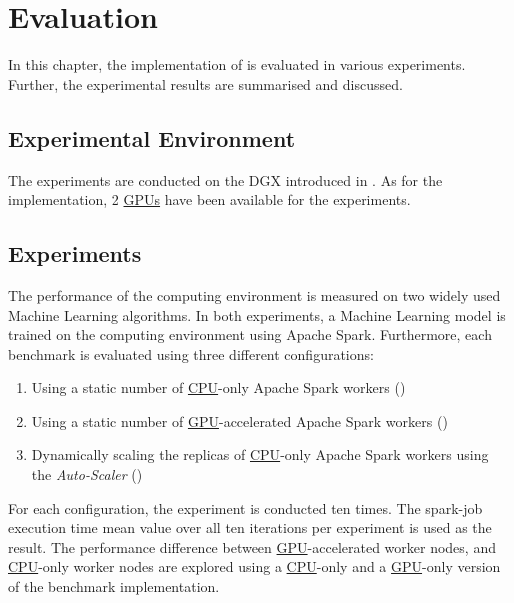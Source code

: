 \chapter{Evaluation}
\label{chap:07_evaluation}

In this chapter, the implementation of  is evaluated in various experiments. Further, the experimental results are summarised and discussed.

\section{Experimental Environment}
%
The experiments are conducted on the DGX introduced in .
As for the implementation, 2 \hyperlink{abbr:gpu}{GPUs} have been available for the experiments.


\section{Experiments}
The performance of the computing environment is measured on two widely used Machine Learning algorithms.
In both experiments, a Machine Learning model is trained on the computing environment using Apache Spark. Furthermore, each benchmark is evaluated using three different configurations:
\begin{enumerate}
\item Using a static number of \hyperlink{abbr:cpu}{CPU}-only Apache Spark workers ()
\item Using a static number of \hyperlink{abbr:gpu}{GPU}-accelerated Apache Spark workers ()
\item Dynamically scaling the replicas of \hyperlink{abbr:cpu}{CPU}-only Apache Spark workers using the \textit{Auto-Scaler} ()
\end{enumerate}
For each configuration, the experiment is conducted ten times. The spark-job execution time mean value over all ten iterations per experiment is used as the result.
The performance difference between \hyperlink{abbr:gpu}{GPU}-accelerated worker nodes, and \hyperlink{abbr:cpu}{CPU}-only worker nodes are explored using a \hyperlink{abbr:cpu}{CPU}-only and a \hyperlink{abbr:gpu}{GPU}-only version of the benchmark implementation.

